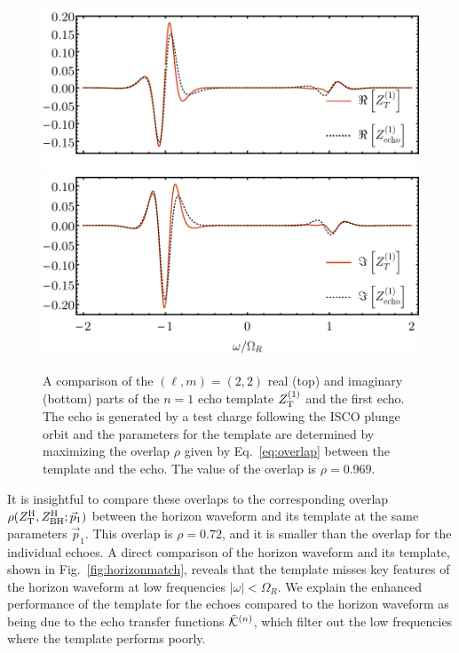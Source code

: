 \begin{refsection}
\begin{figure}[t]
\includegraphics[width = 1 \columnwidth]{chapter_echo/etc/echo1matchReV2}\\
\vspace{-14.5 pt}
\includegraphics[width = 1 \columnwidth]{chapter_echo/etc/echo1matchImV2}
\caption{ A comparison of the $(\ell, m) =(2,2)$ real (top) and imaginary (bottom) parts of the $n=1$ echo template $Z_{\rm T}^{(1)}$  and the first echo. The echo is generated by a test charge following the ISCO plunge orbit and the parameters for the template are determined by maximizing the overlap $\rho$ given by Eq.~\eqref{eq:overlap} between the template and the echo. The value of the overlap is $\rho=0.969$.
}
\label{fig:dirTemcompEchos}
\end{figure}

It is insightful to compare these overlaps to the corresponding overlap
$\rho(Z_{\rm T}^{\rm H},Z_{\rm BH}^{\rm H}; \vec p_1)$ between the horizon waveform and its template at the same parameters $\vec p_1$. 
This overlap is $\rho = 0.72$, and it is smaller than the overlap for the individual echoes. 
A direct comparison of the horizon waveform and its template, shown in Fig.~\ref{fig:horizonmatch}, reveals that the template misses key features of the horizon waveform at low frequencies $|\omega| < \Omega_R$.  
We explain the enhanced performance of the template for the echoes compared to the horizon waveform as being due to the echo transfer functions $\tilde{\mathcal K}^{(n)}$, which filter out the low frequencies where the template performs poorly.


\end{refsection}
